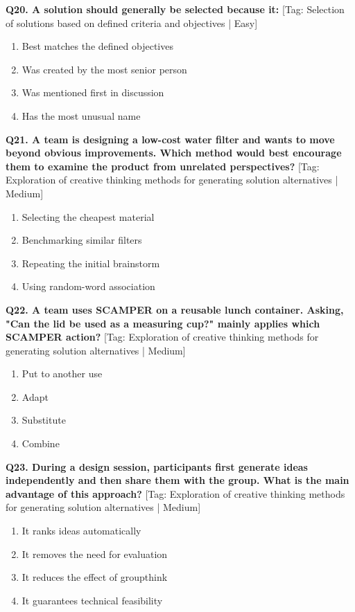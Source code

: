 \noindent\textbf{Q20. A solution should generally be selected because it:} \hfill [Tag: Selection of solutions based on defined criteria and objectives | Easy]
\begin{enumerate}[label=(\alph*),topsep=2pt,itemsep=1pt,partopsep=0pt,parsep=0pt]
    \item {Best matches the defined objectives}
    \item {Was created by the most senior person}
    \item {Was mentioned first in discussion}
    \item {Has the most unusual name}
\end{enumerate}
\vspace{2mm}

\noindent\textbf{Q21. A team is designing a low-cost water filter and wants to move beyond obvious improvements. Which method would best encourage them to examine the product from unrelated perspectives?} \hfill [Tag: Exploration of creative thinking methods for generating solution alternatives | Medium]
\begin{enumerate}[label=(\alph*),topsep=2pt,itemsep=1pt,partopsep=0pt,parsep=0pt]
    \item {Selecting the cheapest material}
    \item {Benchmarking similar filters}
    \item {Repeating the initial brainstorm}
    \item {Using random-word association}
\end{enumerate}
\vspace{2mm}

\noindent\textbf{Q22. A team uses SCAMPER on a reusable lunch container. Asking, "Can the lid be used as a measuring cup?" mainly applies which SCAMPER action?} \hfill [Tag: Exploration of creative thinking methods for generating solution alternatives | Medium]
\begin{enumerate}[label=(\alph*),topsep=2pt,itemsep=1pt,partopsep=0pt,parsep=0pt]
    \item {Put to another use}
    \item {Adapt}
    \item {Substitute}
    \item {Combine}
\end{enumerate}
\vspace{2mm}

\noindent\textbf{Q23. During a design session, participants first generate ideas independently and then share them with the group. What is the main advantage of this approach?} \hfill [Tag: Exploration of creative thinking methods for generating solution alternatives | Medium]
\begin{enumerate}[label=(\alph*),topsep=2pt,itemsep=1pt,partopsep=0pt,parsep=0pt]
    \item {It ranks ideas automatically}
    \item {It removes the need for evaluation}
    \item {It reduces the effect of groupthink}
    \item {It guarantees technical feasibility}
\end{enumerate}
\vspace{2mm}


